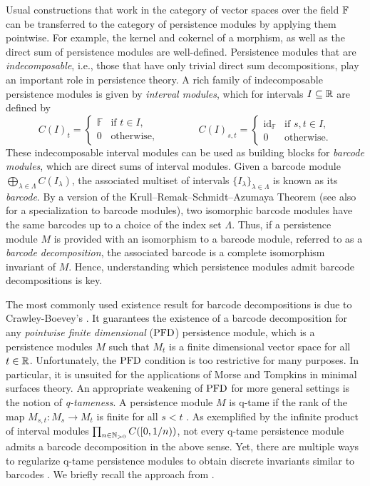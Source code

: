 Usual constructions that work in the category of vector spaces over the field $\mathbb{F}$ can be transferred to the category of persistence modules by applying them pointwise.
For example, the kernel and cokernel of a morphism, as well as the direct sum of persistence modules are well-defined.
Persistence modules that are \emph{indecomposable}, i.e., those that have only trivial direct sum decompositions, play an important role in persistence theory.
A rich family of indecomposable persistence modules is given by \emph{interval modules}, which for intervals $I \subseteq \mathbb{R}$ are defined by
\begin{equation} \label{e:interval module}
C(I)_t =
\begin{cases}
\mathbb{F} & \text{if } t \in I, \\
0 & \text{otherwise},
\end{cases}
\qquad \qquad
C(I)_{s, t} =
\begin{cases}
\operatorname{id}_{\mathbb{F}} & \text{if } s, t \in I, \\
0 & \text{otherwise}.
\end{cases}
\end{equation}
These indecomposable interval modules can be used as building blocks for \emph{barcode modules}, which are direct sums of interval modules.
Given a barcode module $\bigoplus_{\lambda \in \Lambda} C(I_{\lambda})$, the associated multiset of intervals $\{I_{\lambda}\}_{\lambda \in \Lambda}$ is known as its \emph{barcode}.
By a version of the Krull--Remak--Schmidt--Azumaya Theorem \cite{Azumaya.1950} (see also \cite[Theorem 2.7]{Chazal.2016a} for a specialization to barcode modules), two isomorphic barcode modules have the same barcodes up to a choice of the index set $\Lambda$.
Thus, if a persistence module $M$ is provided with an isomorphism to a barcode module, referred to as a \emph{barcode decomposition}, the associated barcode is a complete isomorphism invariant of $M$.
Hence, understanding which persistence modules admit barcode decompositions is key.

The most commonly used existence result for barcode decompositions is due to Crawley-Boevey's \cite{Crawley-Boevey.2015}.
It guarantees the existence of a barcode decomposition for any \emph{pointwise finite dimensional} ($\mathrm{PFD}$) persistence module, which is a persistence modules $M$ such that $M_t$ is a finite dimensional vector space for all $t \in \mathbb{R}$.
Unfortunately, the $\mathrm{PFD}$ condition is too restrictive for many purposes.
In particular, it is unsuited for the applications of Morse and Tompkins in minimal surfaces theory.
An appropriate weakening of $\mathrm{PFD}$ for more general settings is the notion of \emph{q-tameness}.
A persistence module $M$ is q-tame if the rank of the map $M_{s,t} \colon M_s \to M_t$ is finite for all $s < t$ \cite{Chazal.2016a}.
As exemplified by the infinite product of interval modules $\prod_{n \in \mathbb{N}_{> 0}} C([0,1/n))$, not every q-tame persistence module admits a barcode decomposition in the above sense.
Yet, there are multiple ways to regularize q-tame persistence modules to obtain discrete invariants similar to barcodes \cite{Chazal.2016a, Chazal.2016b, Schmahl.2021}.
We briefly recall the approach from \citet{Chazal.2016b}.

